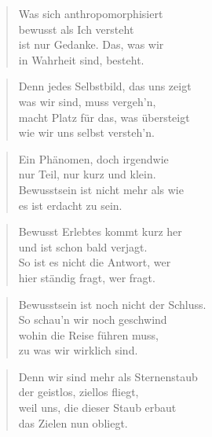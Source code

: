 \documentclass[10pt,a4paper]{article}
\begin{document}
\begin{multicols}{2}
\begin{verse}
Was sich anthropomorphisiert \\
bewusst als Ich versteht \\
ist nur Gedanke. Das, was wir \\
in Wahrheit sind, besteht. \\
\end{verse}

\begin{verse}
Denn jedes Selbstbild, das uns zeigt \\
was wir sind, muss vergeh’n, \\
macht Platz für das, was übersteigt \\
wie wir uns selbst versteh’n. \\
\end{verse}

\begin{verse}
Ein Phänomen, doch irgendwie \\
nur Teil, nur kurz und klein. \\
Bewusstsein ist nicht mehr als wie \\
es ist erdacht zu sein. \\
\end{verse}

\begin{verse}
Bewusst Erlebtes kommt kurz her \\
und ist schon bald verjagt. \\
So ist es nicht die Antwort, wer \\
hier ständig fragt, wer fragt. \\
\end{verse}

\begin{verse}
Bewusstsein ist noch nicht der Schluss. \\
So schau’n wir noch geschwind \\
wohin die Reise führen muss, \\
zu was wir wirklich sind. \\
\end{verse}

\begin{verse}
Denn wir sind mehr als Sternenstaub \\
der geistlos, ziellos fliegt, \\
weil uns, die dieser Staub erbaut \\
das Zielen nun obliegt. \\
\end{verse}


\end{multicols}
\end{document}
